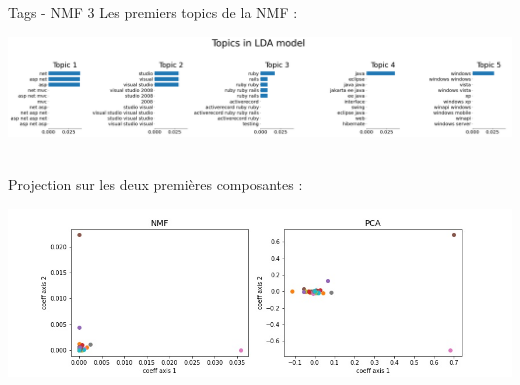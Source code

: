 \documentclass[10pt]{beamer}
\begin{document}
\begin{frame}{Tags - NMF 3}
    Les premiers topics de la NMF : 
    \begin{center}
      \includegraphics[width=\linewidth]{figures/tags_NMF_topics.png}
    \end{center}\\
    \vspace{0.2cm}
    Projection sur les deux premières composantes : 
    \begin{center}
      \includegraphics[width=0.9\linewidth]{figures/tags_NMF_PCA_coeffs12.jpg}
    \end{center}
\end{frame}
\end{document}
